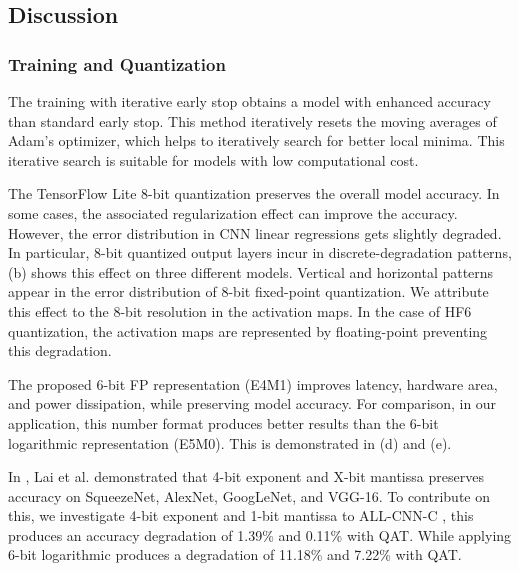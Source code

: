 \subsection{Discussion}
\subsubsection{Training and Quantization}
The training with iterative early stop obtains a model with enhanced accuracy than standard early stop. This method iteratively resets the moving averages of Adam's optimizer, which helps to iteratively search for better local minima. This iterative search is suitable for models with low computational cost.

The TensorFlow Lite 8-bit quantization preserves the overall model accuracy. In some cases, the associated regularization effect can improve the accuracy. However, the error distribution in CNN linear regressions gets slightly degraded. In particular, 8-bit quantized output layers incur in discrete-degradation patterns, (b) shows this effect on three different models. Vertical and horizontal patterns appear in the error distribution of 8-bit fixed-point quantization. We attribute this effect to the 8-bit resolution in the activation maps. In the case of HF6 quantization, the activation maps are represented by floating-point preventing this degradation.

The proposed 6-bit FP representation (E4M1) improves latency, hardware area, and power dissipation, while preserving model accuracy. For comparison, in our application, this number format produces better results than the 6-bit logarithmic representation (E5M0). This is demonstrated in (d) and (e).

In \cite{lai2017deep}, Lai et al. demonstrated that 4-bit exponent and X-bit mantissa preserves accuracy on SqueezeNet, AlexNet, GoogLeNet, and VGG-16. To contribute on this, we investigate 4-bit exponent and 1-bit mantissa to ALL-CNN-C \cite{springenberg2014striving}, this produces an accuracy degradation of 1.39\% and 0.11\% with QAT. While applying 6-bit logarithmic produces a degradation of 11.18\% and 7.22\% with QAT.

